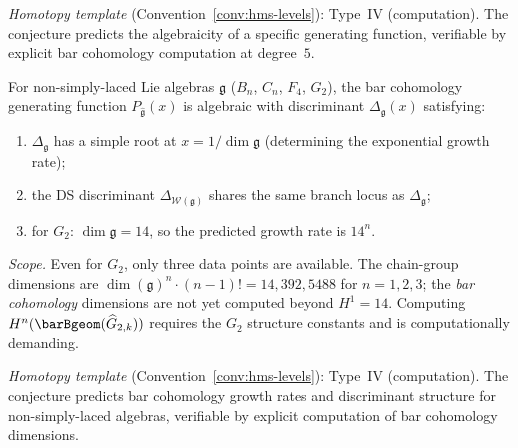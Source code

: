 \begin{remark}[Scope]
\emph{Homotopy template} (Convention~\ref{conv:hms-levels}): Type~IV (computation).
The conjecture predicts the algebraicity of a specific generating function, verifiable by explicit bar cohomology computation at degree~$5$.
\end{remark}

\begin{conjecture}
\label{conj:non-simply-laced-discriminant}
For non-simply-laced Lie algebras $\mathfrak{g}$ ($B_n$, $C_n$, $F_4$, $G_2$), the bar cohomology generating function $P_{\widehat{\mathfrak{g}}}(x)$ is algebraic with discriminant $\Delta_{\mathfrak{g}}(x)$ satisfying:
\begin{enumerate}[label=\textup{(\roman*)}]
\item $\Delta_{\mathfrak{g}}$ has a simple root at $x = 1/\dim\mathfrak{g}$ (determining the exponential growth rate);
\item the DS discriminant $\Delta_{\mathcal{W}(\mathfrak{g})}$ shares the same branch locus as $\Delta_{\mathfrak{g}}$;
\item for $G_2$: $\dim\mathfrak{g} = 14$, so the predicted growth rate is $14^n$.
\end{enumerate}

\emph{Scope.}  Even for $G_2$, only three data points are available.  The chain-group dimensions are $\dim(\mathfrak{g})^n \cdot (n{-}1)! = 14, 392, 5488$ for $n = 1, 2, 3$; the \emph{bar cohomology} dimensions are not yet computed beyond $H^1 = 14$.  Computing $H^n(\barBgeom(\widehat{G}_{2,k}))$ requires the $G_2$ structure constants and is computationally demanding.
\end{conjecture}

\begin{remark}[Scope]
\emph{Homotopy template} (Convention~\ref{conv:hms-levels}): Type~IV (computation).
The conjecture predicts bar cohomology growth rates and discriminant structure for non-simply-laced algebras, verifiable by explicit computation of bar cohomology dimensions.
\end{remark}

